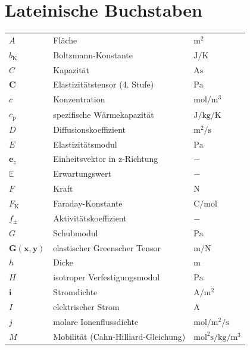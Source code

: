 {\section*{Lateinische Buchstaben}

\begin{longtable}{@{}p{\TabulatorVZ}@{}p{\TabulatorTX}p{\TabulatorEH}@{}}
	$A$					& Fläche					        & $\si{\metre\squared}$\\
	$b_{\text{K}}$		& Boltzmann-Konstante 			    & $\si{\joule\per\kelvin}$ \\
	$C$					& Kapazität					        & $\si{\ampere\second}$\\
	$\boldsymbol{C}$	& Elastizitätstensor (4. Stufe)		& $\si{\pascal}$\\
	$c$					& Konzentration				        & $\si{\mole\per\metre\cubed}$\\
	$c_{\text{p}}$ 		& spezifische Wärmekapazität 		& $\si{\joule\per\kilogram\per\kelvin}$ \\ \addlinespace
	$D$					& Diffusionskoeffizient		        & $\si{\metre\squared\per\second}$\\
	$E$					& Elastizitätsmodul			        & $\si{\pascal}$\\
	$\boldsymbol{e}_z$  & Einheitsvektor in z-Richtung      & $-$ \\
	$\mathbb{E}$        & Erwartungswert                    & $-$ \\
	$F$					& Kraft						        & $\si{\newton}$\\
	$F_{\text{K}}$		& Faraday-Konstante			        & $\si{\coulomb\per\mole}$\\
	$f_{\pm}$			& Aktivitätskoeffizient		        & $-$\\
	$G$					& Schubmodul				        & $\si{\pascal}$\\
	$\boldsymbol{G}(\boldsymbol{x}, \boldsymbol{y})$ & elastischer Greenscher Tensor & $\si{\metre\per\newton}$ \\
	$h$					& Dicke						        & $\si{\metre}$\\
	$H$                 & isotroper Verfestigungsmodul      & $\si{\pascal}$ \\
	$\boldsymbol{i}$	& Stromdichte				        & $\si{\ampere\per\metre\squared}$\\
	$I$                 & elektrischer Strom                & $\si{\ampere}$ \\
	$j$					& molare Ionenflussdichte	        & $\si{\mole\per\metre\squared\per\second}$\\
    $M$                 & Mobilität (Cahn-Hilliard-Gleichung)   &$\si{\mole\squared\second\per\kilo\gram\per\metre\cubed}$\\

\end{longtable}}
